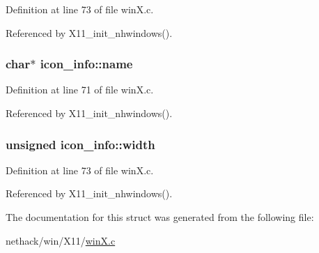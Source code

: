 Definition at line 73 of file win\+X.\+c.



Referenced by X11\+\_\+init\+\_\+nhwindows().

\hypertarget{structicon__info_a04df7988c8ff4df7c9eea4be5e73f063}{
\subsubsection[{name}]{ char$\ast$ icon\+\_\+info\+::name}}\label{structicon__info_a04df7988c8ff4df7c9eea4be5e73f063}


Definition at line 71 of file win\+X.\+c.



Referenced by X11\+\_\+init\+\_\+nhwindows().

\hypertarget{structicon__info_ad71603c600fd9734bcf1b5ee7a695c87}{
\subsubsection[{width}]{\setlength{\rightskip}{0pt plus 5cm}unsigned icon\+\_\+info\+::width}}\label{structicon__info_ad71603c600fd9734bcf1b5ee7a695c87}


Definition at line 73 of file win\+X.\+c.



Referenced by X11\+\_\+init\+\_\+nhwindows().



The documentation for this struct was generated from the following file\+:\begin{DoxyCompactItemize}
\item 
nethack/win/\+X11/\hyperlink{winX_8c}{win\+X.\+c}\end{DoxyCompactItemize}
